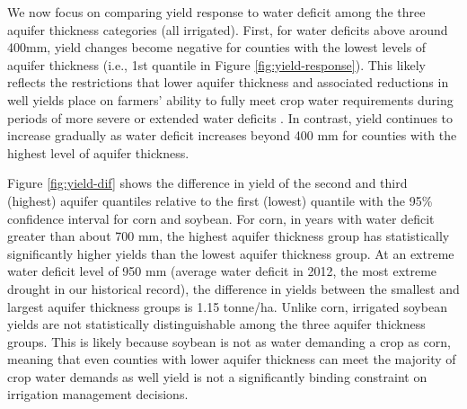 \documentclass[
]{article}
\begin{document}
We now focus on comparing yield response to water deficit among the three aquifer thickness categories (all irrigated). First, for water deficits above around 400mm, yield changes become negative for counties with the lowest levels of aquifer thickness (i.e., 1st quantile in Figure \ref{fig:yield-response}). This likely reflects the restrictions that lower aquifer thickness and associated reductions in well yields place on farmers' ability to fully meet crop water requirements during periods of more severe or extended water deficits \citetext{\citealp[\citet{foster2014modeling}]{rad2020effects}; \citealp{hrozencik2017heterogeneous}}. In contrast, yield continues to increase gradually as water deficit increases beyond 400 mm for counties with the highest level of aquifer thickness.

Figure \ref{fig:yield-dif} shows the difference in yield of the second and third (highest) aquifer quantiles relative to the first (lowest) quantile with the 95\% confidence interval for corn and soybean. For corn, in years with water deficit greater than about 700 mm, the highest aquifer thickness group has statistically significantly higher yields than the lowest aquifer thickness group. At an extreme water deficit level of 950 mm (average water deficit in 2012, the most extreme drought in our historical record), the difference in yields between the smallest and largest aquifer thickness groups is 1.15 tonne/ha. Unlike corn, irrigated soybean yields are not statistically distinguishable among the three aquifer thickness groups. This is likely because soybean is not as water demanding a crop as corn, meaning that even counties with lower aquifer thickness can meet the majority of crop water demands as well yield is not a significantly binding constraint on irrigation management decisions.
\end{document}
